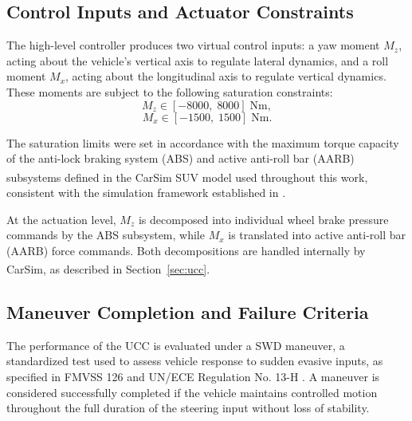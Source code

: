 \documentclass[sn-chicago,iicol]{sn-jnl}
\theoremstyle{thmstyleone}%
\theoremstyle{thmstyletwo}%
\theoremstyle{thmstylethree}%
\begin{document}
\subsection{Control Inputs and Actuator 
            Constraints}\label{sec:actuators}

The high-level controller produces two virtual control inputs: a yaw moment 
$M_z$, acting about the vehicle's vertical axis to regulate lateral dynamics, 
and a roll moment $M_x$, acting about the longitudinal axis to regulate 
vertical dynamics. These moments are subject to the following saturation 
constraints:
\begin{equation}
    M_z \in [-8000,\; 8000] \;\text{Nm},
    \label{Eq:Mz_sat}
\end{equation}
\begin{equation}
    M_x \in [-1500,\; 1500] \;\text{Nm}.
    \label{Eq:Mx_sat}
\end{equation}

The saturation limits were set in accordance with the maximum torque 
capacity of the anti-lock braking system (ABS) and active anti-roll bar 
(AARB) subsystems defined in the CarSim\textsuperscript{\textregistered} 
SUV model used throughout this work, consistent with the simulation 
framework established in \citep{arronte2024controle}.

At the actuation level, $M_z$ is decomposed into individual wheel brake 
pressure commands by the ABS subsystem, while $M_x$ is translated into 
active anti-roll bar (AARB) force commands. Both decompositions are 
handled internally by CarSim\textsuperscript{\textregistered}, as described 
in Section~\ref{sec:ucc}.

\subsection{Maneuver Completion and Failure 
            Criteria}\label{sec:criteria}

The performance of the UCC is evaluated under a SWD maneuver, a 
standardized test used to assess vehicle response to sudden evasive inputs, 
as specified in FMVSS 126 and UN/ECE Regulation No. 13-H \citep{MSC2012}. 
A maneuver is considered successfully completed if the vehicle maintains 
controlled motion throughout the full duration of the steering input 
without loss of stability.
\end{document}
